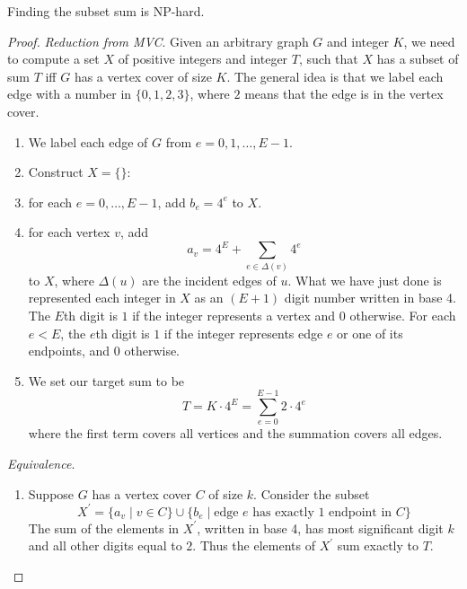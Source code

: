   \begin{theorem}
    \label{thm:subset-sum-is-np-hard}
    Finding the subset sum is NP-hard. 
  \end{theorem}
  \begin{proof}
    \textit{Reduction from MVC}. Given an arbitrary graph $G$ and integer $K$, we need to compute a set $X$ of positive integers and integer $T$, such that $X$ has a subset of sum $T$ iff $G$ has a vertex cover of size $K$. The general idea is that we label each edge with a number in $\{0, 1, 2, 3\}$, where $2$ means that the edge is in the vertex cover. 
    \begin{enumerate}
      \item We label each edge of $G$ from $e = 0, 1, \ldots, E-1$. 
      \item Construct $X = \{\}$: 
      \item for each $e = 0, \ldots, E-1$, add $b_e = 4^e$ to $X$. 
      \item for each vertex $v$, add 
      \begin{equation}
        a_v = 4^{E} + \sum_{e \in \Delta(v)} 4^e
      \end{equation}
      to $X$, where $\Delta(u)$ are the incident edges of $u$. What we have just done is represented each integer in $X$ as an $(E + 1)$ digit number written in base 4. The $E$th digit is $1$ if the integer represents a vertex and $0$ otherwise. For each $e < E$, the $e$th digit is $1$ if the integer represents edge $e$ or one of its endpoints, and $0$ otherwise. 

      \item We set our target sum to be 
      \begin{equation}
        T = K \cdot 4^E = \sum_{e=0}^{E-1} 2 \cdot 4^e
      \end{equation}
      where the first term covers all vertices and the summation covers all edges. 
    \end{enumerate}

    \textit{Equivalence}. 
    \begin{enumerate}
      \item Suppose $G$ has a vertex cover $C$ of size $k$. Consider the subset 
      \begin{equation}
        X^\prime = \{a_v \mid v \in C\} \cup \{b_e \mid \text{edge } e \text{ has exactly 1 endpoint in } C\} 
      \end{equation}
      The sum of the elements in $X^\prime$, written in base 4, has most significant digit $k$ and all other digits equal to $2$. Thus the elements of $X^\prime$ sum exactly to $T$. 


\end{enumerate}
\end{proof}

